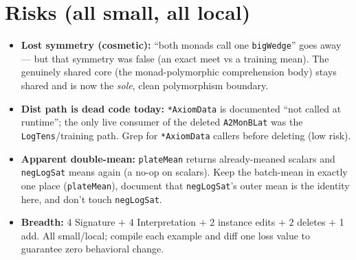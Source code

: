 \documentclass[11pt]{article}
\newcommand{\code}[1]{\texttt{#1}}
\begin{document}
\section*{Risks (all small, all local)}

\begin{itemize}
  \item \textbf{Lost symmetry (cosmetic):} ``both monads call one \code{bigWedge}'' goes away --- but that
        symmetry was false (an exact meet vs a training mean). The genuinely shared core (the
        monad-polymorphic comprehension body) stays shared and is now the \emph{sole}, clean polymorphism
        boundary.
  \item \textbf{Dist path is dead code today:} \code{*AxiomData} is documented ``not called at runtime'';
        the only live consumer of the deleted \code{A2MonBLat} was the \code{LogTens}/training path. Grep for
        \code{*AxiomData} callers before deleting (low risk).
  \item \textbf{Apparent double-mean:} \code{plateMean} returns already-meaned scalars and \code{negLogSat}
        means again (a no-op on scalars). Keep the batch-mean in exactly one place (\code{plateMean}),
        document that \code{negLogSat}'s outer mean is the identity here, and don't touch \code{negLogSat}.
  \item \textbf{Breadth:} 4 Signature $+$ 4 Interpretation $+$ 2 instance edits $+$ 2 deletes $+$ 1 add.
        All small/local; compile each example and diff one loss value to guarantee zero behavioral change.
\end{itemize}
\end{document}
